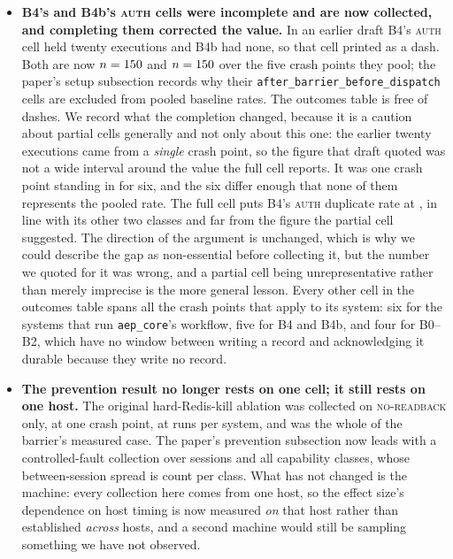 \documentclass[10pt,journal,compsoc]{IEEEtran}
\begin{document}
\begin{itemize}
\item \textbf{B4's and B4b's \textsc{auth} cells were incomplete and are now
      collected, and completing them corrected the value.} In an earlier
      draft B4's \textsc{auth} cell held twenty executions and B4b had none, so
      that cell printed as a dash. Both are now $n=150{}$ and
      $n=150{}$ over the five crash points they pool; the paper's
      setup subsection records why their
      \texttt{after\_barrier\_before\_dispatch} cells are excluded from pooled
      baseline rates. The outcomes table is free of dashes. We record what the completion changed, because it is a caution
      about partial cells generally and not only about this one: the earlier
      twenty executions came from a \emph{single} crash point, so the figure
      that draft quoted was not a wide interval around the value the full cell
      reports. It was one crash point standing in for six, and the six differ
      enough that none of them represents the pooled rate. The full cell puts
      B4's \textsc{auth} duplicate rate at \BfourDupAuth{}, in line with its
      other two classes and far from the figure the partial cell suggested. The
      direction of the argument is unchanged, which is why we could describe the
      gap as non-essential before collecting it, but the number we quoted for it
      was wrong, and a partial cell being unrepresentative rather than merely
      imprecise is the more general lesson. Every other cell in the outcomes
      table spans all the crash points that apply to its system: six for the
      systems that run \texttt{aep\_core}'s workflow, five for B4 and B4b, and
      four for B0--B2, which have no window between writing a record and
      acknowledging it durable because they write no record.

\item \textbf{The prevention result no longer rests on one cell; it still rests
      on one host.} The original hard-Redis-kill ablation was collected on
      \textsc{no-readback} only, at one crash point, at \AepKillRuns{} runs per
      system, and was the whole of the barrier's measured case. The paper's
      prevention subsection now leads with a controlled-fault collection over
      \ArmASessions{} sessions and all \ArmAClasses{} capability classes, whose
      between-session spread is \ArmASpreadMax{} count per class. What has not
      changed is the machine: every collection here comes from one host, so the
      effect size's dependence on host timing is now measured \emph{on} that
      host rather than established \emph{across} hosts, and a second machine
      would still be sampling something we have not observed.


\end{itemize}
\end{document}
